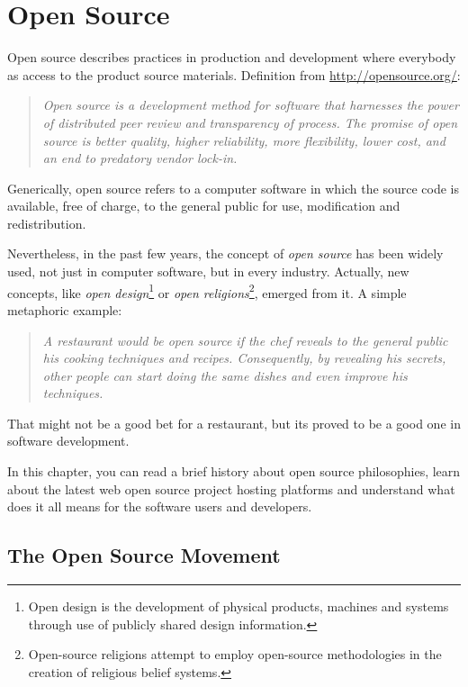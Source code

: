 \thispagestyle{empty}
\chapter{Open Source}\label{chap:open_source}


 
Open source describes practices in production and development where everybody as access to the product source materials.
Definition from \url{http://opensource.org/}:
\begin{quote}\emph{
  Open source is a development method for software that harnesses the power of distributed peer review and transparency of process.
  The promise of open source is better quality, higher reliability, more flexibility, lower cost, 
  and an end to predatory vendor lock-in.
}\end{quote}

Generically, open source refers to a computer software in which the source code is available, free of charge, to the general public for use, modification and redistribution.

Nevertheless, in the past few years, the concept of \emph{open source} 
has been widely used, not just in computer software, but in every industry.
Actually, new concepts, like 
\emph{open design}\footnote{
  Open design is the development of physical products, machines and systems through use of publicly shared design information.
} or 
\emph{open religions}\footnote{
  Open-source religions attempt to employ open-source methodologies in the creation of religious belief systems.
},
emerged from it.
A simple metaphoric example: 
\begin{quote}\emph{
A restaurant would be open source if the chef reveals to the general public his cooking techniques and recipes.
Consequently, by revealing his secrets, other people can start doing the same dishes and even improve his techniques.
}\end{quote}
That might not be a good bet for a restaurant, but its proved to be a good one in software development.

In this chapter, you can read a brief history about open source philosophies, 
learn about the latest web open source project hosting platforms
and understand what does it all means for the software users and developers.


\section{The Open Source Movement}

